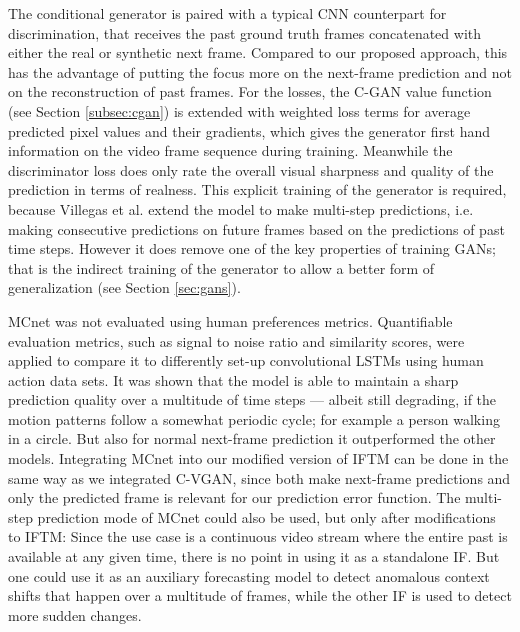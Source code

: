 The conditional generator is paired with a typical CNN counterpart for discrimination, that receives the past ground truth frames concatenated with either the real or synthetic next frame. Compared to our proposed approach, this has the advantage of putting the focus more on the next-frame prediction and not on the reconstruction of past frames. For the losses, the C-GAN value function (see Section \ref{subsec:cgan}) is extended with weighted loss terms for average predicted pixel values and their gradients, which gives the generator first hand information on the video frame sequence during training. Meanwhile the discriminator loss does only rate the overall visual sharpness and quality of the prediction in terms of realness. This explicit training of the generator is required, because Villegas et al. extend the model to make multi-step predictions, i.e. making consecutive predictions on future frames based on the predictions of past time steps. However it does remove one of the key properties of training GANs; that is the indirect training of the generator to allow a better form of generalization (see Section \ref{sec:gans}).

MCnet was not evaluated using human preferences metrics. Quantifiable evaluation metrics, such as signal to noise ratio and similarity scores, were applied to compare it to differently set-up convolutional LSTMs using human action data sets. It was shown that the model is able to maintain a sharp prediction quality over a multitude of time steps --- albeit still degrading, if the motion patterns follow a somewhat periodic cycle; for example a person walking in a circle. But also for normal next-frame prediction it outperformed the other models. Integrating MCnet into our modified version of IFTM can be done in the same way as we integrated C-VGAN, since both make next-frame predictions and only the predicted frame is relevant for our prediction error function. The multi-step prediction mode of MCnet could also be used, but only after modifications to IFTM: Since the use case is a continuous video stream where the entire past is available at any given time, there is no point in using it as a standalone IF. But one could use it as an auxiliary forecasting model to detect anomalous context shifts that happen over a multitude of frames, while the other IF is used to detect more sudden changes.

